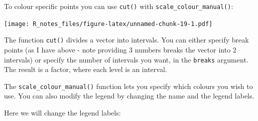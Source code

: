 \documentclass[]{book}
\newenvironment{Shaded}{\begin{snugshade}}{\end{snugshade}}
\newcommand{\KeywordTok}[1]{\textcolor[rgb]{0.13,0.29,0.53}{\textbf{#1}}}
\newcommand{\DataTypeTok}[1]{\textcolor[rgb]{0.13,0.29,0.53}{#1}}
\newcommand{\DecValTok}[1]{\textcolor[rgb]{0.00,0.00,0.81}{#1}}
\newcommand{\StringTok}[1]{\textcolor[rgb]{0.31,0.60,0.02}{#1}}
\newcommand{\OperatorTok}[1]{\textcolor[rgb]{0.81,0.36,0.00}{\textbf{#1}}}
\newcommand{\NormalTok}[1]{#1}
\begin{document}
To colour specific points you can use \texttt{cut()} with
\texttt{scale\_colour\_manual()}:

\begin{Shaded}
\end{Shaded}

\texttt{[image: R\_notes\_files/figure-latex/unnamed-chunk-19-1.pdf]}

The function \texttt{cut()} divides a vector into intervals. You can
either specify break points (as I have above - note providing 3 numbers
breaks the vector into 2 intervals) or specify the number of intervals
you want, in the \texttt{breaks} argument. The result is a factor, where
each level is an interval.

The \texttt{scale\_colour\_manual()} function lets you specify which
colours you wish to use. You can also modify the legend by changing the
name and the legend labels.

Here we will change the legend labels:

\begin{Shaded}
\end{Shaded}
\end{document}

